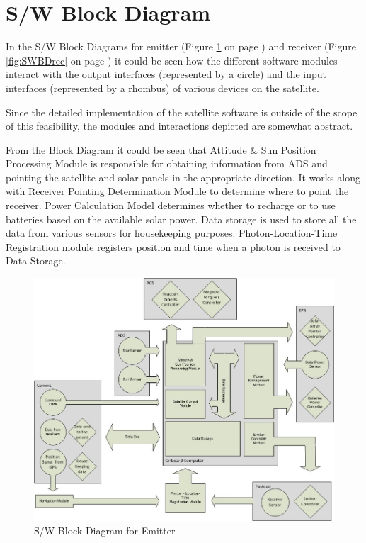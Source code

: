 \section{S/W Block Diagram}
\label{section_SWBD}

In the S/W Block Diagrams for emitter (Figure \ref{fig:SWBDemit} on page \pageref{fig:SWBDemit}) and receiver (Figure \ref{fig:SWBDrec} on page \pageref{fig:SWBDrec})  it could be seen how the different software modules interact with the output interfaces (represented by a circle) and the input interfaces (represented by a rhombus) of various devices on the satellite. 
 
Since the detailed implementation of the satellite software is outside of the scope of this feasibility, the modules and interactions depicted are somewhat abstract.  

From the Block Diagram it could be seen that Attitude \& Sun Position Processing Module is responsible for obtaining information from \ac{ADS} and pointing the satellite and solar panels in the appropriate direction. It works along with Receiver Pointing Determination Module to determine where to point the receiver. Power Calculation Model determines whether to recharge or to use batteries based on the available solar power. Data storage is used to store all the data from various sensors for housekeeping purposes. Photon-Location-Time Registration module registers position and time when a photon is received to Data Storage.

\begin{landscape}
\begin{figure}[ht!]
\centering
\includegraphics[width=1\textheight]{chapters/img/SWBDemit.jpg}
\caption{S/W Block Diagram for Emitter }
\label{fig:SWBDemit}
\end{figure}
\end{landscape}

